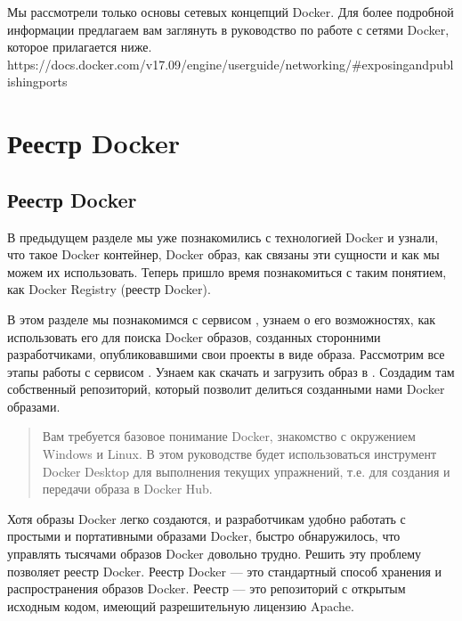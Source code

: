 \documentclass[letterpaper,10pt,russian]{sphinxmanual}
\begin{document}
\sphinxAtStartPar
Мы рассмотрели только основы сетевых концепций Docker. Для более подробной информации предлагаем вам заглянуть в руководство по работе с сетями Docker, которое прилагается ниже.
https://docs.docker.com/v17.09/engine/userguide/networking/\#exposing\sphinxhyphen{}and\sphinxhyphen{}publishing\sphinxhyphen{}ports


\chapter{Реестр Docker}
\label{\detokenize{index:id17}}
\sphinxstepscope


\section{Реестр Docker}
\label{\detokenize{educational_materials/docker_hub/content:docker}}\label{\detokenize{educational_materials/docker_hub/content::doc}}
\sphinxAtStartPar
В предыдущем разделе мы уже познакомились с технологией Docker и узнали, что такое Docker контейнер, Docker образ, как связаны эти сущности и как мы можем их использовать. Теперь пришло время познакомиться с таким понятием, как Docker Registry (реестр Docker).

\sphinxAtStartPar
В этом разделе мы познакомимся с сервисом , узнаем о его возможностях, как использовать его для поиска Docker образов, созданных сторонними разработчиками, опубликовавшими свои проекты в виде образа.
Рассмотрим все этапы работы с сервисом . Узнаем как скачать и загрузить образ в . Создадим там собственный репозиторий, который позволит делиться созданными нами Docker образами.
\begin{quote}

\sphinxAtStartPar
Вам требуется базовое понимание Docker, знакомство с окружением Windows и Linux. В этом руководстве будет использоваться инструмент Docker Desktop для выполнения текущих упражнений, т.е. для создания и передачи образа в Docker Hub.
\end{quote}

\sphinxAtStartPar
Хотя образы Docker легко создаются, и разработчикам удобно работать с простыми и портативными образами Docker, быстро обнаружилось, что управлять тысячами образов Docker довольно трудно. Решить эту проблему позволяет реестр Docker. Реестр Docker — это стандартный способ хранения и распространения образов Docker. Реестр — это репозиторий с открытым исходным кодом, имеющий разрешительную лицензию Apache.
\end{document}
